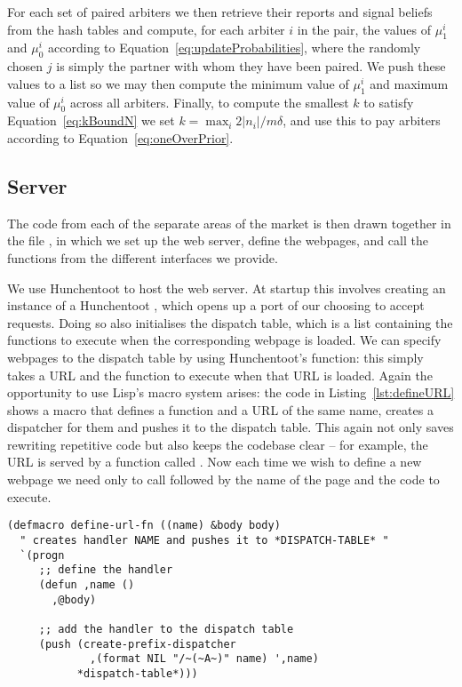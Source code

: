 For each set of paired arbiters we then retrieve their reports and signal
beliefs from the hash tables and compute, for each arbiter $i$ in the pair, the
values of $\mu_1^i$ and $\mu_0^i$ according to
Equation~\ref{eq:updateProbabilities}, where the randomly chosen $j$ is simply
the partner with whom they have been paired. We push these values to a list so
we may then compute the minimum value of $\mu_1^i$ and maximum value of
$\mu_0^i$ across all arbiters. Finally, to compute the smallest $k$ to satisfy
Equation~\ref{eq:kBoundN} we set $k = \max_i 2|n_i|/m\delta$, and use this to
pay arbiters according to Equation~\ref{eq:oneOverPrior}.

\subsection{Server}

\label{sec:server}

The code from each of the separate areas of the market is then drawn together
in the file , in which we set up the web server, define the
webpages, and call the functions from the different interfaces we provide.

We use Hunchentoot to host the web server. At startup this involves creating an
instance of a Hunchentoot , which opens up a port of our
choosing to accept requests. Doing so also initialises the dispatch table,
which is a list containing the functions to execute when the corresponding
webpage is loaded. We can specify webpages to the dispatch table by using
Hunchentoot's  function: this simply takes a URL
and the function to execute when that URL is loaded. Again the opportunity to
use Lisp's macro system arises: the code in Listing~\ref{lst:defineURL} shows a
macro that defines a function and a URL of the same name, creates a dispatcher
for them and pushes it to the dispatch table. This again not only saves
rewriting repetitive code but also keeps the codebase clear -- for example, the
URL  is served by a function called . Now each time we
wish to define a new webpage we need only to call  followed
by the name of the page and the code to execute.

\begin{lstlisting}[float,
	label={lst:defineURL},
	caption={Macroising URL functions}]
(defmacro define-url-fn ((name) &body body)
  " creates handler NAME and pushes it to *DISPATCH-TABLE* "
  `(progn
     ;; define the handler
     (defun ,name ()
       ,@body)

     ;; add the handler to the dispatch table
     (push (create-prefix-dispatcher
             ,(format NIL "/~(~A~)" name) ',name)
           *dispatch-table*)))
\end{lstlisting}

